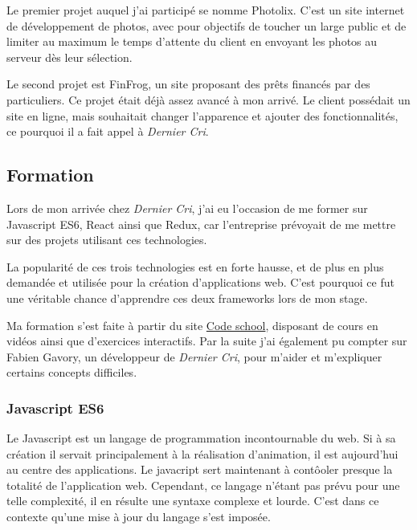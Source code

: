\bigskip

Le premier projet auquel j'ai participé se nomme Photolix. C'est un site
internet de développement de photos, avec pour objectifs de toucher un
large public et de limiter au maximum le temps d'attente du client en
envoyant les photos au serveur dès leur sélection.

\bigskip

Le second projet est FinFrog, un site proposant des prêts financés par
des particuliers. Ce projet était déjà assez avancé à mon arrivé. Le
client possédait un site en ligne, mais souhaitait changer l'apparence
et ajouter des fonctionnalités, ce pourquoi il a fait appel à
\emph{Dernier Cri}.

\bigskip

\subsection{Formation}\label{formation}

\bigskip

Lors de mon arrivée chez \emph{Dernier Cri}, j'ai eu l'occasion de me
former sur Javascript ES6, React ainsi que Redux, car l'entreprise
prévoyait de me mettre sur des projets utilisant ces technologies.

\bigskip

La popularité de ces trois technologies est en forte hausse, et de plus
en plus demandée et utilisée pour la création d'applications web. C'est
pourquoi ce fut une véritable chance d'apprendre ces deux frameworks
lors de mon stage.

\bigskip

Ma formation s'est faite à partir du site
\href{https://www.codeschool.com/}{Code school}, disposant de cours en
vidéos ainsi que d'exercices interactifs. Par la suite j'ai également pu
compter sur Fabien Gavory, un développeur de \emph{Dernier Cri}, pour
m'aider et m'expliquer certains concepts difficiles.

\bigskip

\subsubsection{Javascript ES6}\label{javascript-es6}

\bigskip

Le Javascript est un langage de programmation incontournable du web. Si
à sa création il servait principalement à la réalisation d'animation, il
est aujourd'hui au centre des applications. Le javacript sert maintenant
à contôoler presque la totalité de l'application web. Cependant, ce
langage n'étant pas prévu pour une telle complexité, il en résulte une
syntaxe complexe et lourde. C'est dans ce contexte qu'une mise à jour du
langage s'est imposée.

